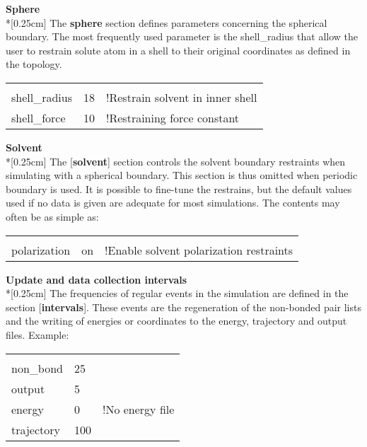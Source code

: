\documentclass[a4paper,10pt]{article}
\begin{document}
\bigskip
\textbf{Sphere}\\*[0.25cm] The \textbf{sphere} section defines
parameters concerning the spherical boundary. The most frequently
used parameter is the shell\_radius that allow the user to
restrain solute atom in a shell to their original coordinates as
defined in the topology.

\begin{center}
\begin{tabularx}{\textwidth}{|l l X|}
  \hline
  [sphere]    &    & \\
  shell\_radius & 18 & !Restrain solvent in inner shell \\
  shell\_force & 10 & !Restraining force constant \\ \hline
\end{tabularx}
\end{center}

\bigskip
\textbf{Solvent}\\*[0.25cm] The [\textbf{solvent}] section
controls the solvent boundary restraints when simulating with a
spherical boundary. This section is thus omitted when periodic
boundary is used. It is possible to fine-tune the restrains, but
the default values used if no data is given are adequate for most
simulations. The contents may often be as simple as:

\begin{center}
\begin{tabularx}{\textwidth}{|l l X|}
  \hline
  [solvent]    &    & \\
  polarization & on & !Enable solvent polarization restraints \\ \hline
\end{tabularx}
\end{center}

\bigskip
\textbf{Update and data collection intervals}\\*[0.25cm] The
frequencies of regular events in the simulation are defined in the
section [\textbf{intervals}]. These events are the regeneration of
the non-bonded pair lists and the writing of energies or
coordinates to the energy, trajectory and output files. Example:

\begin{center}
\begin{tabularx}{\textwidth}{|l l X|}
  \hline
  [intervals] &     & \\
  non{\_}bond & 25  & \\
  output      & 5   & \\
  energy      & 0   & !No energy file \\
  trajectory  & 100 &  \\ \hline
\end{tabularx}
\end{center}
\end{document}
